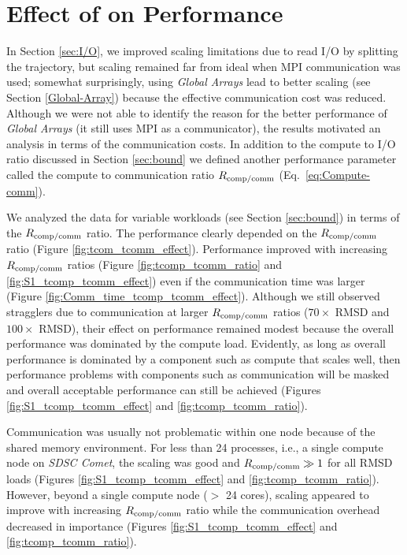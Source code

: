 
\section{Effect of \Rcompcomm on Performance}
\label{sec:tcomm}

In Section \ref{sec:I/O}, we improved scaling limitations due to read I/O by splitting the trajectory, but scaling remained far from ideal when MPI communication was used; somewhat surprisingly, using \emph{Global Arrays} lead to better scaling (see Section \ref{Global-Array}) because the effective communication cost was reduced.
Although we were not able to identify the reason for the better performance of \emph{Global Arrays} (it still uses MPI as a communicator), the results motivated an analysis in terms of the communication costs.
In addition to the compute to I/O ratio \RcompIO discussed in Section \ref{sec:bound} we defined another performance parameter called the compute to communication ratio $R_{\text{comp/comm}}$ (Eq.~\ref{eq:Compute-comm}).

We analyzed the data for variable workloads (see Section \ref{sec:bound}) in terms of the $R_{\text{comp/comm}}$ ratio.
The performance clearly depended on the $R_{\text{comp/comm}}$ ratio (Figure \ref{fig:tcom_tcomm_effect}).
Performance improved with increasing $R_{\text{comp/comm}}$ ratios (Figure \ref{fig:tcomp_tcomm_ratio} and \ref{fig:S1_tcomp_tcomm_effect}) even if the communication time was larger (Figure \ref{fig:Comm_time_tcomp_tcomm_effect}).
Although we still observed stragglers due to communication at larger $R_{\text{comp/comm}}$ ratios ($70\times$ RMSD and $100\times$ RMSD), their effect on performance remained modest because the overall performance was dominated by the compute load. 
Evidently, as long as overall performance is dominated by a component such as compute that scales well, then performance problems with components such as communication will be masked and overall acceptable performance can still be achieved (Figures \ref{fig:S1_tcomp_tcomm_effect} and \ref{fig:tcomp_tcomm_ratio}).

Communication was usually not problematic within one node because of the shared memory environment.
For less than 24 processes, i.e., a single compute node on \emph{SDSC Comet}, the scaling was good and $R_{\text{comp/comm}} \gg 1$ for all RMSD loads (Figures \ref{fig:S1_tcomp_tcomm_effect} and \ref{fig:tcomp_tcomm_ratio}).
However, beyond a single compute node ($>$ 24 cores), scaling appeared to improve with increasing $R_{\text{comp/comm}}$ ratio while the communication overhead decreased in importance (Figures \ref{fig:S1_tcomp_tcomm_effect} and \ref{fig:tcomp_tcomm_ratio}).

